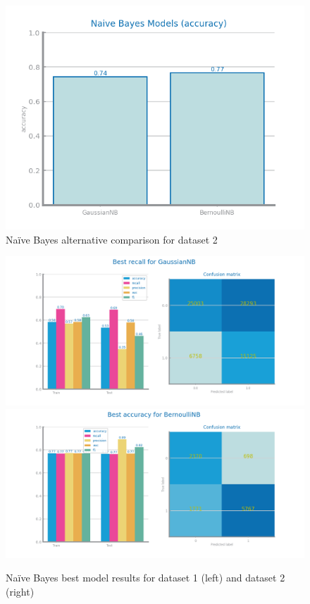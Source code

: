 \documentclass[10pt]{extarticle}
\begin{document}
\begin{figure}[H]
\centering\includegraphics[scale=0.95]{images/dataset2/models_evaluation/Credit_Score_nb_accuracy_study.png}
\caption{Na{\"i}ve Bayes alternative comparison for dataset 2}
\end{figure}

\begin{figure}[H]
\centering\includegraphics[scale=0.4]{images/dataset1/models_evaluation/CovidPos_GaussianNB_best_recall_eval.png}
\includegraphics[scale=0.4]{images/dataset2/models_evaluation/Credit_Score_nb_BernoulliNB_best_accuracy_eval.png}
\caption{Na{\"i}ve Bayes best model results for dataset 1 (left) and dataset 2 (right)}
\end{figure}
\end{document}
